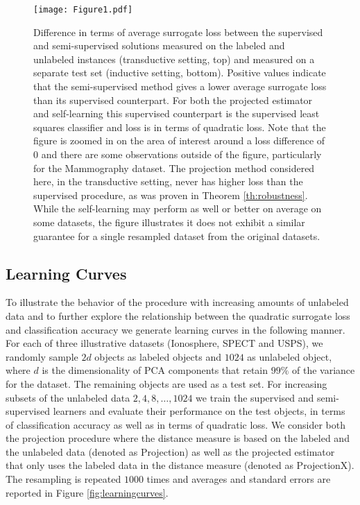 \documentclass{article}
\begin{document}
\begin{figure*}
\centering
\texttt{[image: Figure1.pdf]}
\caption{Difference in terms of average surrogate loss between the supervised and semi-supervised solutions measured on the labeled and unlabeled instances (transductive setting, top) and measured on a separate test set (inductive setting, bottom). Positive values indicate that the semi-supervised method gives a lower average surrogate loss than its supervised counterpart. For both the projected estimator and self-learning this supervised counterpart is the supervised least squares classifier and loss is in terms of quadratic loss. Note that the figure is zoomed in on the area of interest around a loss difference of $0$ and there are some observations outside of the figure, particularly for the Mammography dataset. The projection method considered here, in the transductive setting, never has higher loss than the supervised procedure, as was proven in Theorem \ref{th:robustness}. While the self-learning may perform as well or better on average on some datasets, the figure illustrates it does not exhibit a similar guarantee for a single resampled dataset from the original datasets.}
\label{fig:lossdifference}
\end{figure*}

\subsection{Learning Curves}
To illustrate the behavior of the procedure with increasing amounts of unlabeled data and to further explore the relationship between the quadratic surrogate loss and classification accuracy we generate learning curves in the following manner. For each of three illustrative datasets (Ionosphere, SPECT and USPS), we randomly sample $2 d$ objects as labeled objects and $1024$ as unlabeled object, where $d$ is the dimensionality of PCA components that retain $99\%$ of the variance for the dataset. The remaining objects are used as a test set. For increasing subsets of the unlabeled data $2,4,8,\dots,1024$ we train the supervised and semi-supervised learners and evaluate their performance on the test objects, in terms of classification accuracy as well as in terms of quadratic loss. We consider both the projection procedure where the distance measure is based on the labeled and the unlabeled data (denoted as Projection) as well as the projected estimator that only uses the labeled data in the distance measure (denoted as ProjectionX). The resampling is repeated $1000$ times and averages and standard errors are reported in Figure \ref{fig:learningcurves}.
\end{document}
